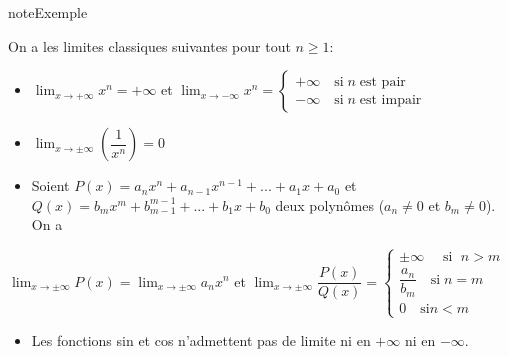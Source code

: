 \documentclass[letterpaper,10pt,french]{jupyterBook}
\begin{document}
\begin{sphinxadmonition}{note}{Exemple}

\sphinxAtStartPar
On a les limites classiques suivantes pour tout \(n\geq 1:\)
\begin{itemize}
\item {} 
\sphinxAtStartPar
\(\lim_{x\rightarrow +\infty}x^n=+\infty\) et \(\lim_{x\rightarrow-\infty}x^n=\left\{
\begin{array}{ll}
+\infty \quad\mbox{si} \;n\;\mbox{est pair}\\
-\infty \quad\mbox{si}\;n\;\mbox{est impair}
\end{array}
\right.\)

\item {} 
\sphinxAtStartPar
\(\lim_{x\rightarrow \pm\infty}(\dfrac{1}{x^n})=0\)

\item {} 
\sphinxAtStartPar
Soient \(P(x)=a_n x^n+a_{n-1}x^{n-1}+...+a_1 x+a_0\) et \(Q(x)=b_m x^m+b_{m-1}^{m-1}+...+b_1 x+b_0\) deux polynômes (\(a_n\neq0\) et \(b_m\neq 0\)). On a

\end{itemize}

\sphinxAtStartPar
\(\lim_{x\rightarrow\pm\infty}P(x)=\lim_{x\rightarrow\pm\infty}a_n x^n\) et \(\lim_{x\rightarrow\pm\infty}\dfrac{P(x)}{Q(x)}=\left\{
\begin{array}{ll}
\pm\infty \quad\mbox{ si } \; n>m\\
\dfrac{a_n}{b_m} \quad\mbox{si}\;n=m\\
0 \quad\mbox{si} n<m
\end{array}
\right.\)
\begin{itemize}
\item {} 
\sphinxAtStartPar
Les fonctions sin et cos n’admettent pas de limite ni en \(+\infty\) ni en \(-\infty.\)

\end{itemize}
\end{sphinxadmonition}
\end{document}
